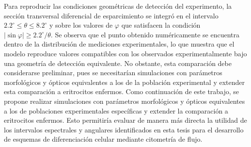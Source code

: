 Para reproducir las condiciones geométricas de detección del experimento, la sección transversal diferencial de esparcimiento se integró en el intervalo $2.2^\circ\leq\theta\leq8.2^\circ$ y sobre los valores de $\varphi$ que satisfacen la condición $|\sin\varphi|\geq 2.2^\circ/\theta$. Se observa que el punto obtenido numéricamente se encuentra dentro de la distribución de mediciones experimentales, lo que muestra que el modelo reproduce valores compatibles con los observados experimentalmente bajo una geometría de detección equivalente. No obstante, esta comparación debe considerarse preliminar, pues se necesitarían simulaciones con parámetros morfológicos y ópticos equivalentes a los de la población experimental y extender esta comparación a eritrocitos enfermos. Como continuación de este trabajo, se propone realizar simulaciones con parámetros morfológicos y ópticos equivalentes a los de poblaciones experimentales específicas y extender la comparación a eritrocitos enfermos. Esto permitiría evaluar de manera más directa la utilidad de los intervalos espectrales y angulares identificados en esta tesis para el desarrollo de esquemas de diferenciación celular mediante citometría de flujo.


 

